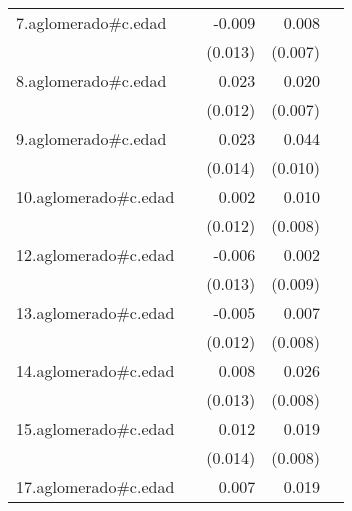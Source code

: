 {\begin{longtable}{l*{4}{D{.}{.}{-1}}}
\addlinespace
7.aglomerado#c.edad&                     &      -0.009         &       0.008         &                     \\
            &                     &     (0.013)         &     (0.007)         &                     \\
\addlinespace
8.aglomerado#c.edad&                     &       0.023         &       0.020\sym{**} &                     \\
            &                     &     (0.012)         &     (0.007)         &                     \\
\addlinespace
9.aglomerado#c.edad&                     &       0.023         &       0.044\sym{***}&                     \\
            &                     &     (0.014)         &     (0.010)         &                     \\
\addlinespace
10.aglomerado#c.edad&                     &       0.002         &       0.010         &                     \\
            &                     &     (0.012)         &     (0.008)         &                     \\
\addlinespace
12.aglomerado#c.edad&                     &      -0.006         &       0.002         &                     \\
            &                     &     (0.013)         &     (0.009)         &                     \\
\addlinespace
13.aglomerado#c.edad&                     &      -0.005         &       0.007         &                     \\
            &                     &     (0.012)         &     (0.008)         &                     \\
\addlinespace
14.aglomerado#c.edad&                     &       0.008         &       0.026\sym{***}&                     \\
            &                     &     (0.013)         &     (0.008)         &                     \\
\addlinespace
15.aglomerado#c.edad&                     &       0.012         &       0.019\sym{*}  &                     \\
            &                     &     (0.014)         &     (0.008)         &                     \\
\addlinespace
17.aglomerado#c.edad&                     &       0.007         &       0.019         &                     \\

\end{longtable}}
